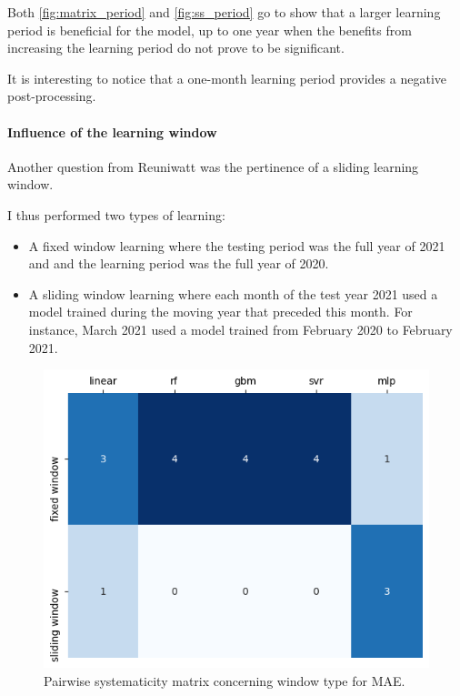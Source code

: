 Both \autoref{fig:matrix_period} and \autoref{fig:ss_period} go to show that a larger learning period is beneficial for the model, up to one year when 
the benefits from increasing the learning period do not prove to be significant.

It is interesting to notice that a one-month learning period provides a negative post-processing.
\paragraph{Influence of the learning window}
\indent 

Another question from Reuniwatt was the pertinence of a sliding learning window.

I thus performed two types of learning:
\begin{itemize}
    \item A fixed window learning where the testing period was the full year of 2021 and and the learning period was the full year of 2020.
    \item A sliding window learning where each month of the test year 2021 used a model trained during the moving year that preceded this month. For instance, March 2021 used a model trained from February 2020 to February 2021.
\end{itemize}
\newpage
\begin{figure}[htb!]
    \centering
    \includegraphics[width=0.7\columnwidth]{figures/first_study/comp_window_mae.png}
\caption{Pairwise systematicity matrix concerning window type for MAE.}
\end{figure}

